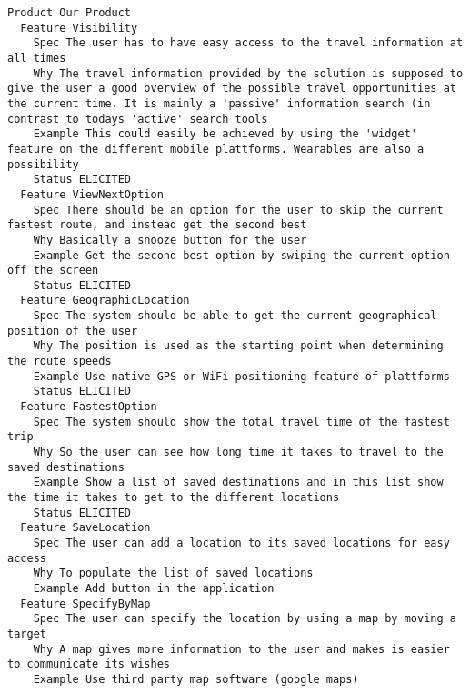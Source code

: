 
\begin{lstlisting}
Product Our Product
  Feature Visibility
    Spec The user has to have easy access to the travel information at all times
    Why The travel information provided by the solution is supposed to give the user a good overview of the possible travel opportunities at the current time. It is mainly a 'passive' information search (in contrast to todays 'active' search tools
    Example This could easily be achieved by using the 'widget' feature on the different mobile plattforms. Wearables are also a possibility
    Status ELICITED
  Feature ViewNextOption
    Spec There should be an option for the user to skip the current fastest route, and instead get the second best
    Why Basically a snooze button for the user
    Example Get the second best option by swiping the current option off the screen
    Status ELICITED
  Feature GeographicLocation
    Spec The system should be able to get the current geographical position of the user
    Why The position is used as the starting point when determining the route speeds
    Example Use native GPS or WiFi-positioning feature of plattforms
    Status ELICITED
  Feature FastestOption
    Spec The system should show the total travel time of the fastest trip
    Why So the user can see how long time it takes to travel to the saved destinations
    Example Show a list of saved destinations and in this list show the time it takes to get to the different locations
    Status ELICITED
  Feature SaveLocation
    Spec The user can add a location to its saved locations for easy access
    Why To populate the list of saved locations
    Example Add button in the application
  Feature SpecifyByMap
    Spec The user can specify the location by using a map by moving a target
    Why A map gives more information to the user and makes is easier to communicate its wishes
    Example Use third party map software (google maps)

\end{lstlisting}